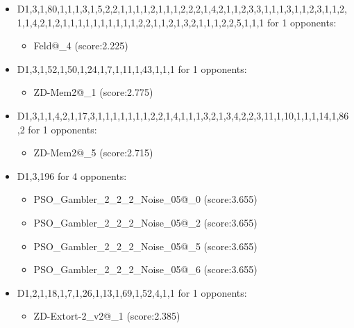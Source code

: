 \begin{appendices}
\begin{itemize}
        \item D1,3,1,80,1,1,1,3,1,5,2,2,1,1,1,1,2,1,1,1,2,2,2,1,4,2,1,1,2,3,3,1,1,1,3,1,1,2,3,1,1,2,1,1,4,2,1,2,1,1,1,1,1,1,1,1,1,1,2,2,1,1,2,1,3,2,1,1,1,2,2,5,1,1,1 for 1 opponents:
        \begin{multicols}{3}
            \begin{itemize}
                \item Feld@\_4 (score:2.225)
            \end{itemize}
        \end{multicols}

        \item D1,3,1,52,1,50,1,24,1,7,1,11,1,43,1,1,1 for 1 opponents:
        \begin{multicols}{3}
            \begin{itemize}
                \item ZD-Mem2@\_1 (score:2.775)
            \end{itemize}
        \end{multicols}

        \item D1,3,1,1,4,2,1,17,3,1,1,1,1,1,1,1,2,2,1,4,1,1,1,3,2,1,3,4,2,2,3,11,1,10,1,1,1,14,1,86,2 for 1 opponents:
        \begin{multicols}{3}
            \begin{itemize}
                \item ZD-Mem2@\_5 (score:2.715)
            \end{itemize}
        \end{multicols}

        \item D1,3,196 for 4 opponents:
        \begin{multicols}{3}
            \begin{itemize}
                \item PSO\_Gambler\_2\_2\_2\_Noise\_05@\_0 (score:3.655)
                \item PSO\_Gambler\_2\_2\_2\_Noise\_05@\_2 (score:3.655)
                \item PSO\_Gambler\_2\_2\_2\_Noise\_05@\_5 (score:3.655)
                \item PSO\_Gambler\_2\_2\_2\_Noise\_05@\_6 (score:3.655)
            \end{itemize}
        \end{multicols}

        \item D1,2,1,18,1,7,1,26,1,13,1,69,1,52,4,1,1 for 1 opponents:
        \begin{multicols}{3}
            \begin{itemize}
                \item ZD-Extort-2\_v2@\_1 (score:2.385)
            \end{itemize}
        \end{multicols}


\end{itemize}
\end{appendices}
